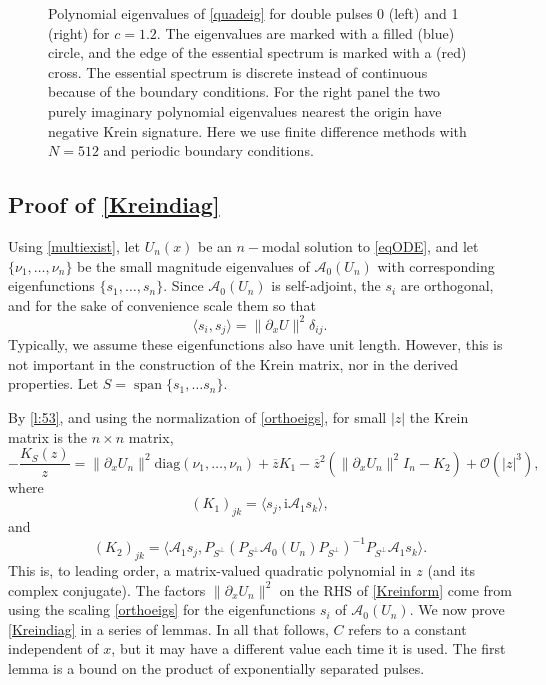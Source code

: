 \documentclass[review,onefignum,onetabnum]{siamart171218}
\newcommand{\R}{\mathbb{R}}
\def\Span{\mathop\mathrm{span}\nolimits}
\newcommand{\rmi}{\mathrm{i}}
\newcommand{\calA}{\mathcal{A}}
\newcommand{\vI}{\bm{\mathit{I}}}
\newcommand{\vK}{\bm{\mathit{K}}}
\begin{document}
\begin{figure}[ht]
\begin{tabular}{cc}
\end{tabular}
\caption{Polynomial eigenvalues of \cref{quadeig} for double pulses 0 (left) and 1 (right) for $c=1.2$. The eigenvalues are marked with a filled (blue) circle, and the edge of the essential spectrum is marked with a (red) cross. The essential spectrum is discrete instead of continuous because of the boundary conditions. For the right panel the two purely imaginary polynomial eigenvalues nearest the origin have negative Krein signature. Here we use finite difference methods with $N = 512$ and periodic boundary conditions.}
\label{fig:quadeigdouble}
\end{figure}

\subsection{Proof of \cref{Kreindiag}}\label{s:kreinproof}

Using \cref{multiexist}, let $U_n(x)$ be an $n-$modal solution to \cref{eqODE}, and let $\{\nu_1, \dots, \nu_n\}$ be the small magnitude eigenvalues of $\calA_0(U_n)$ with corresponding eigenfunctions $\{ s_1, \dots, s_n \}$. Since $\calA_0(U_n)$ is self-adjoint, the $s_i$ are orthogonal, and for the sake of convenience scale them so that
\begin{equation}\label{orthoeigs}
\langle s_i, s_j \rangle = \|\partial_x U \|^2 \delta_{ij}.
\end{equation}
Typically, we assume these eigenfunctions also have unit length. However, this is not important in the construction of the Krein matrix, nor in the derived properties. Let $S = \Span\{s_1, \dots s_n\}$.

By \cref{l:53}, and using the normalization of \cref{orthoeigs}, for small $|z|$ the Krein matrix is the $n \times n$ matrix,
\begin{equation}\label{Kreinform}
-\frac{\vK_S(z)}{z} = \|\partial_xU_n\|^2 \text{diag}(\nu_1, \dots, \nu_n) + \overline{z}\vK_1
- \overline{z}^2 ( \|\partial_xU_n\|^2\vI_n - \vK_2) + \mathcal{O}(|z|^3),
\end{equation}
where
\begin{equation}\label{defK1}
(\vK_1)_{jk} = \langle s_j, \rmi\calA_1 s_k \rangle,
\end{equation}
and
\begin{equation}\label{defK2}
(\vK_2)_{jk} = \langle \calA_1 s_j, P_{S^\perp}(P_{S^\perp} \calA_0(U_n)P_{S^\perp})^{-1} P_{S^\perp}\calA_1 s_k \rangle.
\end{equation}
This is, to leading order, a matrix-valued quadratic polynomial in $z$ (and its complex conjugate). %
The factors $\|\partial_xU_n\|^2$ on the RHS of \cref{Kreinform} come from using the scaling \cref{orthoeigs} for the eigenfunctions $s_i$ of $\calA_0(U_n)$.
We now prove \cref{Kreindiag} in a series of lemmas. In all that follows, $C$ refers to a constant independent of $x$, but it may have a different value each time it is used. The first lemma is a bound on the product of exponentially separated pulses.
\end{document}
